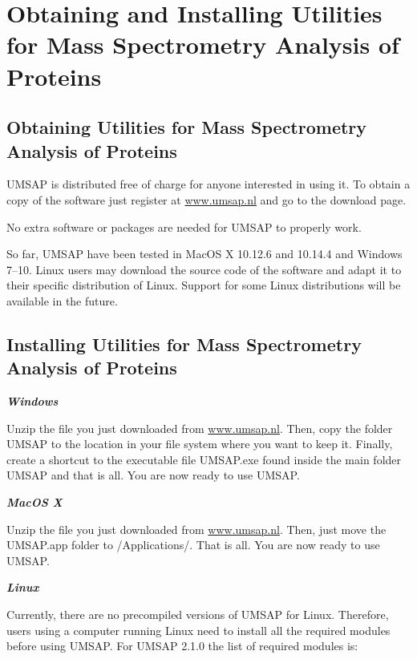 \chapter{Obtaining and Installing Utilities for Mass Spectrometry Analysis of Proteins}

\section{Obtaining Utilities for Mass Spectrometry Analysis of Proteins}

UMSAP is distributed free of charge for anyone interested in using it. To obtain a copy of the software just register at \href{https://www.umsap.nl}{www.umsap.nl} and go to the download page.

No extra software or packages are needed for UMSAP to properly work.

So far, UMSAP have been tested in MacOS X \num[parse-numbers=false]{10.12.6} and \num[parse-numbers=false]{10.14.4} and Windows \numrange[range-phrase = /]{7}{10}. Linux users may download the source code of the software and adapt it to their specific distribution of Linux. Support for some Linux distributions will be available in the future. 

\section{Installing Utilities for Mass Spectrometry Analysis of Proteins}

\textit{\textbf{Windows}}

Unzip the file you just downloaded from \href{https://www.umsap.nl}{www.umsap.nl}. Then, copy the folder UMSAP to the location in your file system where you want to keep it. Finally, create a shortcut to the executable file UMSAP.exe found inside the main folder UMSAP and that is all. You are now ready to use UMSAP.

\textit{\textbf{MacOS X}}

Unzip the file you just downloaded from \href{https://www.umsap.nl}{www.umsap.nl}. Then, just move the UMSAP.app folder to /Applications/. That is all. You are now ready to use UMSAP.

\newpage

\textit{\textbf{Linux}}

Currently, there are no precompiled versions of UMSAP for Linux. Therefore, users using a computer running Linux need to install all the required modules before using UMSAP. For UMSAP \num[parse-numbers=false]{2.1.0} the list of required modules is:

